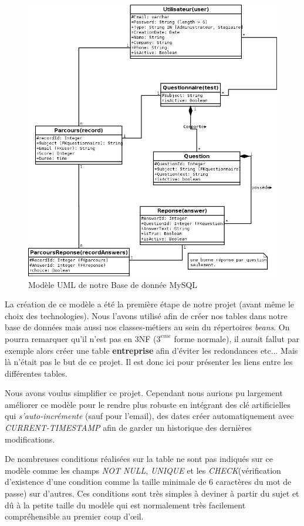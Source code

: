 \documentclass[a4paper]{article}
\begin{document}
\begin{figure}[h]
\centering
\includegraphics[width=1\textwidth]{Modele.png}
\caption{\label{fig:model_uml}Modèle UML de notre Base de donnée MySQL}
\end{figure}

La création de ce modèle a été la première étape de notre projet (avant même le choix des technologies). Nous l'avons utilisé afin de créer nos tables dans notre base de données mais aussi nos classes-métiers au sein du répertoires \textit{beans}.
On pourra remarquer qu'il n'est pas en 3NF ($3^{eme}$ forme normale), il aurait fallut par exemple alors créer une table \textbf{entreprise} afin d'éviter les redondances etc... Mais là n'était pas le but de ce projet. Il est donc ici pour présenter les liens entre les différentes tables. 

Nous avons voulus simplifier ce projet. Cependant nous aurions pu largement améliorer ce modèle pour le rendre plus robuste en intégrant des clé artificielles qui \textit{s'auto-incrémente} (sauf pour l'email), des dates créer automatiquement avec \textit{CURRENT-TIMESTAMP} afin de garder un historique des dernières modifications. 

De nombreuses conditions réalisées sur la table ne sont pas indiqués sur ce modèle comme les champs \textit{NOT NULL}, \textit{UNIQUE} et les \textit{CHECK}(vérification d'existence d'une condition comme la taille minimale de 6 caractères du mot de passe) sur d'autres. Ces conditions sont très simples à deviner à partir du sujet et dû à la petite taille du modèle qui est normalement très facilement compréhensible au premier coup d'œil.
\end{document}
